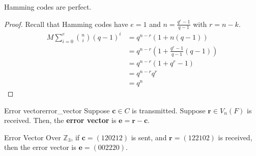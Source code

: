 \begin{Theorem}{}{}
    Hamming codes are perfect.
\end{Theorem}

\begin{proof}
    Recall that Hamming codes have $ e=1 $ and $ n=\frac{q^r-1}{q-1} $ with $ r=n-k $.
    \begin{align*}
        M \sum\limits_{i=0}^{e} \binom{n}{i}(q-1)^i
         & =q^{n-r}(1+n(q-1))                               \\
         & =q^{n-r}\left( 1+\frac{q^r-1}{q-1} (q-1) \right) \\
         & = q^{n-r}(1+q^r-1)                               \\
         & =q^{n-r}q^r                                      \\
         & =q^n
    \end{align*}
\end{proof}

\begin{Definition}{Error vector}{error_vector}
    Suppose $ \bm{c}\in C $ is transmitted. Suppose $ \bm{r}\in V_n(F) $ is received.
    Then, the \textbf{error vector} is $ \bm{e}=\bm{r}-\bm{c} $.
\end{Definition}

\begin{Example}{Error Vector}{}
    Over $ \mathbb{Z}_3 $, if $ \bm{c}=(120212) $ is sent, and $ \bm{r}=(122102) $ is received, then
    the error vector is $ \bm{e}=(002220) $.
\end{Example}
